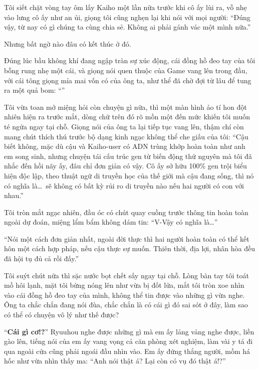 ﻿\documentclass[../main.tex]{subfiles}
\begin{document}
Tôi siết chặt vòng tay ôm lấy Kaiho một lần nữa trước khi cô ấy lùi ra, vỗ nhẹ vào lưng cô ấy như an ủi, giọng tôi cũng nghẹn lại khi nói với mọi người: ``Đúng vậy, từ nay có gì chúng ta cùng chia sẻ. Không ai phải gánh vác một mình nữa.''

Nhưng bất ngờ nào đâu có kết thúc ở đó.

Đúng lúc bầu không khí đang ngập tràn sự xúc động, cái đồng hồ đeo tay của tôi bỗng rung nhẹ một cái, và giọng nói quen thuộc của Game vang lên trong đầu, với cái tông giọng mỉa mai vốn có của ông ta, như thể đã chờ đợi từ lâu để tung ra một quả bom: ``''

Tôi vừa toan mở miệng hỏi còn chuyện gì nữa, thì một màn hình ảo tí hon đột nhiên hiện ra trước mắt, dòng chữ trên đó rõ mồn một đến mức khiến tôi muốn té ngửa ngay tại chỗ. Giọng nói của ông ta lại tiếp tục vang lên, thậm chí còn mang chút thích thú trước bộ dạng kinh ngạc không thể che giấu của tôi: ``Cậu biết không, mặc dù cậu và Kaiho-user có ADN trùng khớp hoàn toàn như anh em song sinh, nhưng chuyện tái cấu trúc gen từ biến động thứ nguyên mà tôi đã nhắc đến hồi nãy ấy, đâu chỉ đơn giản có vậy. Cô ấy sở hữu 100\% gen trội biểu hiện độc lập, theo thuật ngữ di truyền học của thế giới mà cậu đang sống, thì nó có nghĩa là\dots\ sẽ không có bất kỳ rủi ro di truyền nào nếu hai người có con với nhau.''

Tôi tròn mắt ngạc nhiên, đầu óc có chút quay cuồng trước thông tin hoàn toàn ngoài dự đoán, miệng lẩm bẩm không dám tin: ``V-Vậy có nghĩa là\dots''

``Nói một cách đơn giản nhất, ngoài đời thực thì hai người hoàn toàn có thể kết hôn một cách hợp pháp, nếu cậu thực sự muốn. Thiên thời, địa lợi, nhân hòa đều đã hội tụ đủ cả rồi đấy.''

Tôi suýt chút nữa thì sặc nước bọt chết sấy ngay tại chỗ. Lòng bàn tay tôi toát mồ hôi lạnh, mặt tôi bừng nóng lên như vừa bị đốt lửa, mắt tôi tròn xoe nhìn vào cái đồng hồ đeo tay của mình, không thể tin được vào những gì vừa nghe. Ông ta chắc chắn đang nói đùa, chắc chắn là có cái gì đó sai sót ở đây, làm sao có thể có chuyện vô lý như thế được?

``\textbf{Cái gì cơ!?}'' Ryuuhou nghe được những gì mà em ấy lảng vảng nghe được, liền gào lên, tiếng nói của em ấy vang vọng cả căn phòng xét nghiệm, làm vài y tá đi qua ngoài cửa cũng phải ngoái đầu nhìn vào. Em ấy đứng thẳng người, mồm há hốc như vừa nhìn thấy ma: ``Anh nói thật á? Lại còn có vụ đó thật á!?''
\end{document}
